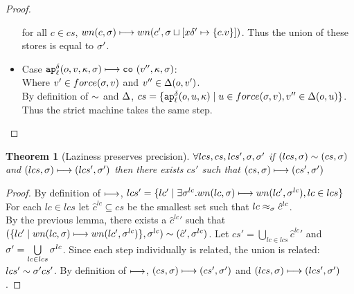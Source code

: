 \documentclass[preprint,onecolumn,9pt]{sigplanconf} %
\newtheorem{theorem}{Theorem}
\begin{document}
\begin{proof}
\begin{itemize}
{      for all $c \in cs$, $wn(c,\msto) \machstep wn(c',\msto\sqcup[\mvar\mcntr' \mapsto \{c.\mval\}])$.
      Thus the union of these stores is equal to $\msto'$.}
\item{Case $\ap[^\mcntr_\mlab]{\mop, \mval, \mkont,\msto} \machstep
            \co{\mval'', \mkont, \msto}$: \\
      Where $\mval' \in force(\msto, \mval)$
        and $\mval'' \in\interpdelta(\mop,\mval')$. \\
      By definition of $\capprx{}{}$ and $\interpdelta$,
        $cs = \{\ap[^\mcntr_\mlab]{\mop, \mvalx{u}, \mkont} \mid
                \mvalx{u} \in force(\msto, \mval),
                \mval'' \in\interpdelta(\mop,\mvalx{u})\}$.
      Thus the strict machine takes the same step.}
\end{itemize}
\end{proof}


\begin{theorem}[Laziness preserves precision]
$\forall lcs,cs,lcs',\msto,\msto'$ if $\capprx{(lcs, \msto)}{(cs,\msto)}$
  and $(lcs,\msto) \machstep (lcs',\msto')$ then there exists $cs'$
  such that $(cs,\msto) \machstep (cs',\msto')$
\end{theorem}
\begin{proof}
By definition of $\machstep$,
$lcs' = \{lc' \mid \exists \msto^{lc}. wn(lc,\msto) \machstep wn(lc', \msto^{lc}), lc \in lcs\}$
For each $lc \in lcs$ let $\hat{c}^{lc} \subseteq cs$ be the
smallest set such that $\lapprx{lc}{\msto}{\hat{c}^{lc}}$. \\ By the
previous lemma, there exists a $\hat{c}^{lc}{}'$ such that $\capprx{(\{lc' \mid wn(lc,\msto) \machstep
  wn(lc', \msto^{lc})\}, \msto^{lc})}{(\hat{c}',\msto^{lc})}$. Let
$cs' = \bigcup\limits_{lc \in lcs}{\hat{c}^{lc}{}'}$ and $\msto' = \bigcup\limits_{lc \in lcs}{\msto^{lc}}$.
Since each step individually is related, the union is related: $\capprx{lcs'}{\msto'}{cs'}$.
By definition of $\machstep$, $(cs, \msto) \machstep (cs', \msto')$ and $(lcs, \msto) \machstep (lcs', \msto')$.
\end{proof}

\end{document}
